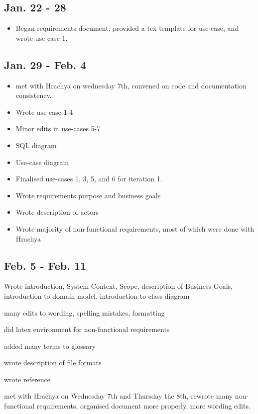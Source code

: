 \documentclass[12pt]{article}
\begin{document}
\maketitle

\subsection*{Jan. 22 - 28}

\begin{itemize}
    \item Began requirements document, provided a tex template for use-case, and wrote use case 1.
\end{itemize}

\subsection*{Jan. 29 - Feb. 4}

\begin{itemize}
    \item met with Hrachya on wednesday 7th, convened on code and documentation consistency.
    \item Wrote use case 1-4
    \item Minor edits in use-cases 5-7
    \item SQL diagram
    \item Use-case diagram
    \item Finalised use-cases 1, 3, 5, and 6 for iteration 1.
    \item Wrote requirements purpose and business goals
    \item Wrote description of actors
    \item Wrote majority of non-functional requirements, most of which were done with Hrachya
\end{itemize}

\subsection*{Feb. 5 - Feb. 11}
    \item Wrote introduction, System Context, Scope, description of Business Goals, introduction to domain model, introduction to class diagram
    \item many edits to wording, spelling mistakes, formatting
    \item did latex environment for non-functional requirements
    \item added many terms to glossary
    \item wrote description of file formats
    \item wrote reference
    \item met with Hrachya on Wednesday 7th and Thursday the 8th, rewrote many non-functional requirements, organised document more properly, more wording edits.
\end{document}

